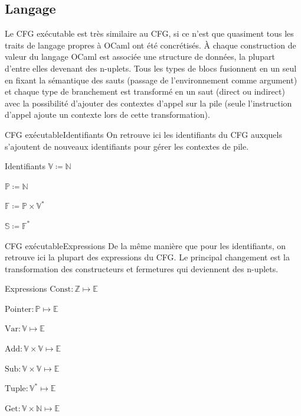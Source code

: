 \documentclass{beamer}
\begin{document}
\subsection{Langage}

Le CFG exécutable est très similaire au CFG, si ce n'est que quasiment tous les traits de langage propres à OCaml ont été concrétisés. À chaque construction de valeur du langage OCaml est associée une structure de données, la plupart d'entre elles devenant des n-uplets. Tous les types de blocs fusionnent en un seul en fixant la sémantique des sauts (passage de l'environnement comme argument) et chaque type de branchement est transformé en un saut (direct ou indirect) avec la possibilité d'ajouter des contextes d'appel sur la pile (seule l'instruction d'appel ajoute un contexte lors de cette transformation).

\begin{frame}{CFG exécutable}{Identifiants}
    On retrouve ici les identifiants du CFG auxquels s'ajoutent de nouveaux identifiants pour gérer les contextes de pile.
    
    \begin{block}{Identifiants}
        $\mathbb{V} \coloneqq \mathbb{N}$%
        
        $\mathbb{P} \coloneqq \mathbb{N}$%
        
        $\mathbb{F} \coloneqq \mathbb{P} \times \mathbb{V}^{*}$%
        
        $\mathbb{S} \coloneqq \mathbb{F}^{*}$%
    \end{block}
\end{frame}

\begin{frame}{CFG exécutable}{Expressions}
    De la même manière que pour les identifiants, on retrouve ici la plupart des expressions du CFG. Le principal changement est la transformation des constructeurs et fermetures qui deviennent des n-uplets.
    
    \begin{block}{Expressions}
        $\text{Const} : \mathbb{Z} \mapsto \mathbb{E}$%
        
        $\text{Pointer} : \mathbb{P} \mapsto \mathbb{E}$%
        
        $\text{Var} : \mathbb{V} \mapsto \mathbb{E}$%
        
        $\text{Add} : \mathbb{V} \times \mathbb{V} \mapsto \mathbb{E}$%
        
        $\text{Sub} : \mathbb{V} \times \mathbb{V} \mapsto \mathbb{E}$%
        
        $\text{Tuple} : \mathbb{V}^{*} \mapsto \mathbb{E}$%
        
        $\text{Get} : \mathbb{V} \times \mathbb{N} \mapsto \mathbb{E}$%
    \end{block}
\end{frame}
\end{document}
